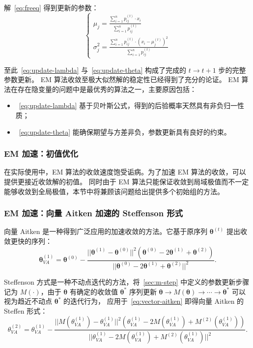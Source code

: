 解~\ref{eq:freeq} 得到更新的参数：
\begin{equation}
    \label{eq:update-theta}
    \begin{cases}
        \mu_j=\frac{\sum_{i=1}^np_{ij}^{(t)}\cdot x_i}{\sum_{i=1}^np_{ij}^{(t)}} \\
        \sigma_j^2=\frac{\sum_{i=1}^np_{ij}^{(t)}\cdot\left(x_i-\mu_j^{(t)}\right)^2}{\sum_{i=1}^np_{ij}^{(t)}}
    \end{cases}
\end{equation}

至此~\eqref{eq:update-lambda} 与~\eqref{eq:update-theta} 构成了完成的 $t\rightarrow t+1$ 步的完整参数更新。
EM 算法收敛至极大似然解的稳定性已经得到了充分的论证。
EM 算法在存在隐变量的问题中是最优秀的算法之一，主要原因包括：
\begin{itemize}
    \item~\eqref{eq:update-lambda} 基于贝叶斯公式，得到的后验概率天然具有非负归一性质；
    \item~\eqref{eq:update-theta} 能确保期望与方差非负，参数更新具有良好的约束。
\end{itemize}

\subsubsection{EM 加速：初值优化}
在实际使用中，EM 算法的收敛速度饱受诟病。为了加速 EM 算法的收敛，可以提供更接近收敛解的初值。
同时由于 EM 算法只能保证收敛到局域极值而不一定能够收敛到全局极值，本节中将兼顾该问题给出提供多个初始组的方法。

\subsubsection{EM 加速：向量 Aitken 加速的 Steffenson 形式}
向量 Aitken 是一种得到广泛应用的加速收敛的方法。它基于原序列 $\boldsymbol{\theta}^{(t)}$ 提出收敛更快的序列：
\begin{equation}
    \label{eq:vector-aitken}
    \boldsymbol{\theta}_{VA}^{(1)}=\boldsymbol{\theta}^{(0)}-
    \frac{||\boldsymbol{\theta}^{(1)}-\boldsymbol{\theta}^{(0)}||^2
    (\boldsymbol{\theta}^{(0)}-2\boldsymbol{\theta}^{(1)}+\boldsymbol{\theta}^{(2)})}
    {||\boldsymbol{\theta}^{(0)}-2\boldsymbol{\theta}^{(1)}+\boldsymbol{\theta}^{(2)}||^2}.
\end{equation}

Steffenson 方式是一种不动点迭代的方法，将~\ref{sec:m-step} 中定义的参数更新步骤记为 $M(\cdot)$，由于 $\boldsymbol{\theta}$ 有确定的收敛值 $\boldsymbol{\theta}^*$
序列更新 $\boldsymbol{\theta}\rightarrow M(\boldsymbol{\theta})\rightarrow\cdots\rightarrow\boldsymbol{\theta}^{*}$ 可以视为趋近不动点 $\boldsymbol{\theta}^*$ 的迭代行为，
应用于~\eqref{eq:vector-aitken} 即得向量 Aitken 的 Steffen 形式：
\begin{equation}
    \label{eq:steffenson}
    \theta_{VA}^{(2)}=\theta_{VA}^{(1)}-\frac{||M(\theta_{VA}^{(1)})-
    \theta_{VA}^{(1)}||^2(\theta_{VA}^{(1)}-2M(\theta_{VA}^{(1)})+M^{(2)}
    (\theta_{VA}^{(1)}))}{||\theta_{VA}^{(1)}-2M(\theta_{VA}^{(1)})+M^{(2)}(\theta_{VA}^{(1)})||^2}.
\end{equation}

